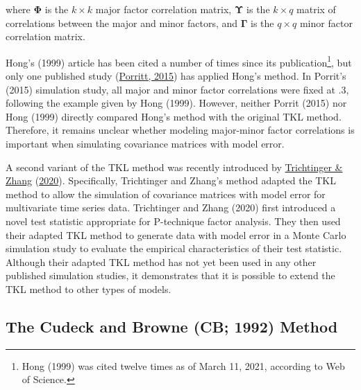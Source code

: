 \documentclass[11pt]{umnthesis}
\begin{document}
\noindent where \(\bm{\Phi}\) is the \(k \times k\) major factor correlation matrix, \(\bm{\Upsilon}\) is the \(k \times q\) matrix of correlations between the major and minor factors, and \(\bm{\Gamma}\) is the \(q \times q\) minor factor correlation matrix.

Hong's (1999) article has been cited a number of times since its publication\footnote{Hong (1999) was cited twelve times as of March 11, 2021, according to Web of Science.}, but only one published study (\protect\hyperlink{ref-porritt2015}{Porritt, 2015}) has applied Hong's method. In Porrit's (2015) simulation study, all major and minor factor correlations were fixed at .3, following the example given by Hong (1999). However, neither Porrit (2015) nor Hong (1999) directly compared Hong's method with the original TKL method. Therefore, it remains unclear whether modeling major-minor factor correlations is important when simulating covariance matrices with model error.

A second variant of the TKL method was recently introduced by \protect\hyperlink{ref-trichtinger2020}{Trichtinger \& Zhang} (\protect\hyperlink{ref-trichtinger2020}{2020}). Specifically, Trichtinger and Zhang's method adapted the TKL method to allow the simulation of covariance matrices with model error for multivariate time series data. Trichtinger and Zhang (2020) first introduced a novel test statistic appropriate for P-technique factor analysis. They then used their adapted TKL method to generate data with model error in a Monte Carlo simulation study to evaluate the empirical characteristics of their test statistic. Although their adapted TKL method has not yet been used in any other published simulation studies, it demonstrates that it is possible to extend the TKL method to other types of models.

\hypertarget{cb}{%
\subsection{The Cudeck and Browne (CB; 1992) Method}\label{cb}}
\end{document}
